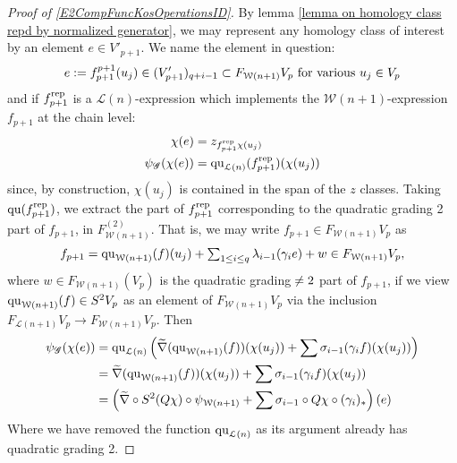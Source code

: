 \documentclass[11pt]{amsart}
\theoremstyle{plain}
\theoremstyle{definition}
\renewcommand{\to}{\longrightarrow}
\newcommand{\scrG}{\mathscr{G}}
\newcommand{\calW}{\mathcal{W}}
\newcommand{\calL}{\mathcal{L}}
\theoremstyle{plain}
\newcommand{\BSW}{{\scrG}}
\newcommand{\quadratic}{\textup{qu}}
\begin{document}
\begin{Operations in composite functor spectral sequences}
\begin{proof}[Proof of \ref{E2CompFuncKosOperationsID}]
By lemma \ref{lemma on homology class repd by normalized generator}, we may represent any homology class of interest by an element $e\in V'_{p+1}$. We name the element in question:
\[e:=f^{p+1}_{p+1}(u_j)\in (V'_{p+1})_{q+i-1}\subset F_{\calW(n+1)}V_p\textup{ for various }u_j\in V_{p}\]
and if $f_{p+1}^\textup{rep}$ is a $\calL(n)$-expression which implements the $\calW(n+1)$-expression $f_{p+1}$ at the chain level:
\begin{alignat*}{2}
\chi(e)&=z_{f_{p+1}^\textup{rep}\chi(u_j)}\\
\psi_{\BSW}(\chi(e))&=\quadratic_{\calL(n)}(f_{p+1}^\textup{rep})(\chi(u_j))
\end{alignat*}
since, by construction, $\chi(u_j)$ is contained in the span of the $z$ classes.  Taking $\quadratic(f_{p+1}^\textup{rep})$, we extract the part of $f_{p+1}^\textup{rep}$ corresponding to the quadratic grading 2 part of $f_{p+1}$, in $F_{\calW(n+1)}^{(2)}$. That is, we may write $f_{p+1}\in F_{\calW(n+1)}V_p$ as
\[f_{p+1}=\quadratic_{\calW(n+1)}(f)(u_j)+\textstyle\sum_{1\leq i\leq q} \lambda_{i-1}(\gamma_ie) + w\in F_{\calW(n+1)}V_p,\]
where $w\in F_{\calW(n+1)}(V_p)$ is the quadratic grading$\makebox[0cm][l]{}\neq2$ part of $f_{p+1}$, if we view $\quadratic_{\calW(n+1)}(f)\in S^2V_p$ as an element of $F_{\calW(n+1)}V_p$ via the inclusion $F_{\calL(n+1)}V_p\to F_{\calW(n+1)}V_p$. Then
\begin{alignat*}{2}
\psi_\BSW(\chi(e))&=\quadratic_{\calL(n)} \left(\widetilde{\nabla}(\quadratic_{\calW(n+1)}(f))(\chi(u_j))+\sum \sigma_{i-1}(\gamma_if)(\chi(u_j))\right)\\
&=\widetilde{\nabla}(\quadratic_{\calW(n+1)}(f))(\chi(u_j))+\sum \sigma_{i-1}(\gamma_if)(\chi(u_j))\\
&=\left(\widetilde{\nabla}\circ S^2(Q\chi)\circ \psi_{\calW(n+1)}+\sum\sigma_{i-1}\circ Q\chi\circ(\gamma_i)_*\right)(e)
\end{alignat*}
Where we have removed the function $\quadratic_{\calL(n)}$ as its argument already has quadratic grading 2.
\end{proof}


\end{Operations in composite functor spectral sequences}
\end{document}

